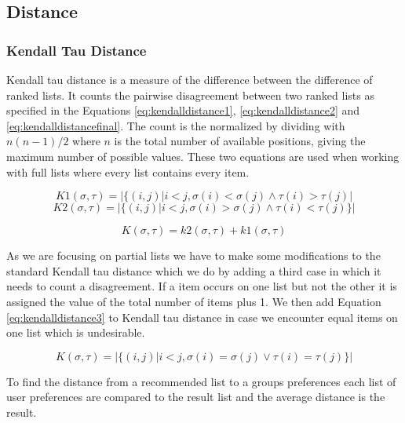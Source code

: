 \subsection{Distance}

\subsubsection{Kendall Tau Distance}
Kendall tau distance is a measure of the difference between the difference of ranked lists\citep{rank:aggregation}. It counts the pairwise disagreement between two ranked lists as specified in the Equations \ref{eq:kendalldistance1}, \ref{eq:kendalldistance2} and \ref{eq:kendalldistancefinal}. The count is the normalized by dividing with $n(n-1)/2$ where $n$ is the total number of available positions, giving the maximum number of possible values. 
These two equations are used when working with full lists where every list contains every item. 

\begin{equation}\label{eq:kendalldistance1}
K1(\sigma,\tau) = | \{(i,j) | i < j, \sigma (i) < \sigma (j) \land \tau (i) > \tau (j)|
\end{equation}
\begin{equation}\label{eq:kendalldistance2}
K2(\sigma,\tau) = | \{(i,j) | i < j, \sigma (i) > \sigma (j) \land \tau (i) < \tau (j) \} |
\end{equation}

\begin{equation}\label{eq:kendalldistancefinal}
K(\sigma,\tau) = k2(\sigma,\tau) + k1(\sigma,\tau)
\end{equation}

As we are focusing on partial lists we have to make some modifications to the standard Kendall tau distance which we do by adding a third case in which it needs to count a disagreement. If a item occurs on one list but not the other it is assigned the value of the total number of items plus 1. We then add Equation \ref{eq:kendalldistance3} to Kendall tau distance in case we encounter equal items on one list which is undesirable.

\begin{equation}\label{eq:kendalldistance3}
K(\sigma,\tau) = | \{(i,j) | i < j, \sigma (i) = \sigma (j) \lor \tau (i) = \tau (j) \} |
\end{equation}

To find the distance from a recommended list to a groups preferences each list of user preferences are compared to the result list and the average distance is the result. 



